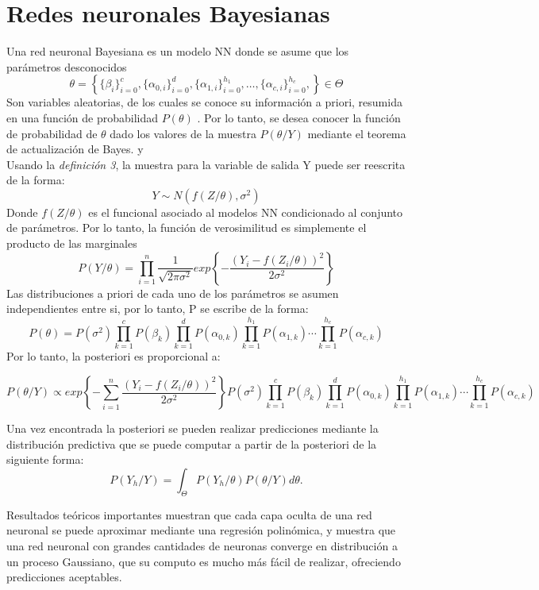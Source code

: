 \documentclass[nojss]{jss}
\begin{document}
\section{Redes neuronales Bayesianas} 
 
 Una red neuronal Bayesiana es un modelo NN donde se asume que los parámetros desconocidos $$\theta = \left\{ \{\beta_i\}_{i=0}^{c},\{\alpha_{0,i}\}_{i=0}^{d},\{\alpha_{1,i}\}_{i=0}^{h_1},\ldots, \{\alpha_{c,i}\}_{i=0}^{h_c}, \right\} \in \Theta$$ 
Son variables aleatorias, de los cuales se conoce su información a priori, resumida en una función de probabilidad $P(\theta)$ \cite{Bhat2006}. Por lo tanto, se desea conocer la función de probabilidad de $\theta$ dado los valores de la muestra $P(\theta/Y)$ mediante el teorema de actualización de Bayes. \cite{Miggon} y \cite{degroot19886}\\

Usando la \textit{definición 3}, la muestra para la variable de salida Y puede ser reescrita de la forma:
$$Y \sim N(f(Z/\theta),\sigma^2)$$
Donde $f(Z/ \theta)$ es el funcional asociado al modelos NN condicionado al conjunto de parámetros. Por lo tanto, la función de verosimilitud es simplemente el producto de las marginales
$$P(Y/\theta) = \prod_{i=1}^n\dfrac{1}{\sqrt{2\pi\sigma^2}}exp \left\{ - \dfrac{(Y_i- f(Z_i/\theta) )^2}{2\sigma^2} \right\}$$
Las distribuciones a priori de cada uno de los parámetros se asumen independientes entre si, por lo tanto, P se escribe de la forma:
 $$P(\theta) = P(\sigma^2)\prod_{k=1}^cP(\beta_k)\prod_{k=1}^d P(\alpha_{0,k})\prod_{k=1}^{h_1} P(\alpha_{1,k})\cdots \prod_{k=1}^{h_c} P(\alpha_{c,k})$$
Por lo tanto, la posteriori es proporcional a:

$$P(\theta/Y) \propto  exp \left\{ - \sum_{i=1}^n\dfrac{(Y_i- f(Z_i/\theta) )^2}{2\sigma^2} \right\}P(\sigma^2)\prod_{k=1}^cP(\beta_k)\prod_{k=1}^d P(\alpha_{0,k})\prod_{k=1}^{h_1} P(\alpha_{1,k})\cdots \prod_{k=1}^{h_c} P(\alpha_{c,k})$$ 
 
Una vez encontrada la posteriori se pueden realizar predicciones mediante la distribución  predictiva que se puede computar a partir de la posteriori de la siguiente forma:
$$P(Y_h/Y) = \int_{\Theta}P(Y_h/\theta)P(\theta/Y)d\theta.$$

Resultados teóricos importantes \cite{Cheng2018} muestran que cada capa oculta de una red neuronal se puede aproximar mediante una regresión polinómica, y \cite{Williams1996} muestra que una red neuronal con grandes cantidades de neuronas converge en distribución a un proceso Gaussiano, que su computo es mucho más fácil de realizar, ofreciendo predicciones aceptables.
  
\end{document}
